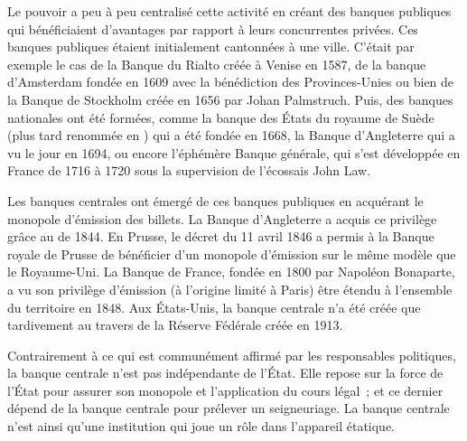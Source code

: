 Le pouvoir a peu à peu centralisé cette activité en créant des banques publiques qui bénéficiaient d'avantages par rapport à leurs concurrentes privées. Ces banques publiques étaient initialement cantonnées à une ville. C'était par exemple le cas de la Banque du Rialto créée à Venise en 1587, de la banque d'Amsterdam fondée en 1609 avec la bénédiction des Provinces-Unies ou bien de la Banque de Stockholm créée en 1656 par Johan Palmstruch. Puis, des banques nationales ont été formées, comme la banque des États du royaume de Suède (plus tard renommée en ) qui a été fondée en 1668, la Banque d'Angleterre qui a vu le jour en 1694, ou encore l'éphémère Banque générale, qui s'est développée en France de 1716 à 1720 sous la supervision de l'écossais John Law. %

Les banques centrales ont émergé de ces banques publiques en acquérant le monopole d'émission des billets. La Banque d'Angleterre a acquis ce privilège grâce au  de 1844. En Prusse, le décret du 11 avril 1846 a permis à la Banque royale de Prusse de bénéficier d'un monopole d'émission sur le même modèle que le Royaume-Uni. La Banque de France, fondée en 1800 par Napoléon Bonaparte, a vu son privilège d'émission (à l'origine limité à Paris) être étendu à l'ensemble du territoire en 1848. Aux États-Unis, la banque centrale n'a été créée que tardivement au travers de la Réserve Fédérale créée en 1913.

Contrairement à ce qui est communément affirmé par les responsables politiques, la banque centrale n'est pas indépendante de l'État. Elle repose sur la force de l'État pour assurer son monopole et l'application du cours légal~; et ce dernier dépend de la banque centrale pour prélever un seigneuriage. La banque centrale n'est ainsi qu'une institution qui joue un rôle dans l'appareil étatique.

